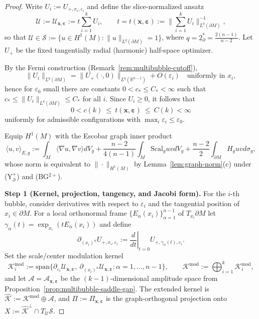 \documentclass[11pt,reqno,a4paper]{amsart}
\newcommand{\R}{\mathbb{R}}
\numberwithin{equation}{section}
\theoremstyle{plain}
\newcommand{\Scal}{\mathrm{Scal}}
\theoremstyle{remark}
\theoremstyle{plain}
\begin{document}
\begin{proof}
Write $U_i:=U_{+,x_i,\varepsilon_i}$ and define the slice-normalized ansatz
\[
\mathcal U:=\mathcal U_{\mathbf x,\boldsymbol\varepsilon}
:=t\sum_{i=1}^k U_i,
\qquad
t=t(\mathbf x,\boldsymbol\varepsilon)
:=\Big\|\sum_{i=1}^k U_i\Big\|_{L^q(\partial M)}^{-1},
\]
so that $\mathcal U\in\mathcal S:=\{u\in H^1(M):\|u\|_{L^q(\partial M)}=1\}$, where
$q=2^*_{\partial}=\frac{2(n-1)}{n-2}$.
Let $U_+$ be the fixed tangentially radial (harmonic) half-space optimizer.

\smallskip
By the Fermi construction (Remark~\ref{rem:multibubble-cutoff}),
\[
\|U_i\|_{L^q(\partial M)}=\|U_+(\cdot,0)\|_{L^q(\R^{n-1})}+O(\varepsilon_i)
\quad\text{uniformly in }x_i,
\]
hence for $\varepsilon_0$ small there are constants $0<c_\ast\le C_\ast<\infty$ such that
$c_\ast\le \|U_i\|_{L^q(\partial M)}\le C_\ast$ for all $i$.
Since $U_i\ge0$, it follows that
\begin{equation}\label{eq:t-asymp}
0<c(k)\ \le\ t(\mathbf x,\boldsymbol\varepsilon)\ \le\ C(k)<\infty
\end{equation}
uniformly for admissible configurations with $\max_i\varepsilon_i\le\varepsilon_0$.

Equip $H^1(M)$ with the Escobar graph inner product
\[
\langle u,v\rangle_{E,g}
:=\int_M \langle\nabla u,\nabla v\rangle dV_g
 +\frac{n-2}{4(n-1)}\int_M \Scal_guvdV_g
 +\frac{n-2}{2}\int_{\partial M}H_guvd\sigma_g,
\]
whose norm is equivalent to $\|\cdot\|_{H^1(M)}$ by Lemma~\ref{lem:graph-norm}(c) under
\textup{(Y$^+_{\partial}$)} and \textup{(BG$^{2+}$)}.

\medskip\noindent
\textbf{Step 1 (Kernel, projection, tangency, and Jacobi form).}
For the $i$-th bubble, consider derivatives with respect to $\varepsilon_i$ and the tangential position of
$x_i\in\partial M$. For a local orthonormal frame $\{E_\alpha(x_i)\}_{\alpha=1}^{n-1}$ of $T_{x_i}\partial M$
let $\gamma_\alpha(t)=\exp_{x_i}(tE_\alpha(x_i))$ and define
\[
\partial_{(x_i)^\alpha}U_{+,x_i,\varepsilon_i}
:=\left.\frac{d}{dt}\right|_{t=0}U_{+,\gamma_\alpha(t),\varepsilon_i}.
\]
Set the scale/center modulation kernel
\[
\mathcal K_i^{\mathrm{mod}}:=\mathrm{span}\Big\{\partial_{\varepsilon_i}\mathcal U_{\mathbf x,\boldsymbol\varepsilon},\
\partial_{(x_i)^\alpha}\mathcal U_{\mathbf x,\boldsymbol\varepsilon}:\alpha=1,\dots,n-1\Big\},
\qquad
\mathcal K^{\mathrm{mod}}:=\bigoplus_{i=1}^k\mathcal K_i^{\mathrm{mod}},
\]
and let $\mathcal A=\mathcal A_{\mathbf x,\boldsymbol\varepsilon}$ be the $(k-1)$-dimensional amplitude space
from Proposition~\ref{prop:multibubble-saddle-gap}. The extended kernel is
$\widehat{\mathcal K}:=\mathcal K^{\mathrm{mod}}\oplus\mathcal A$,
and $\Pi:=\Pi_{\mathbf x,\boldsymbol\varepsilon}$ is the graph-orthogonal projection onto
$X:=\widehat{\mathcal K}^\perp\cap T_{\mathcal U}\mathcal S$.


\end{proof}
\end{document}
